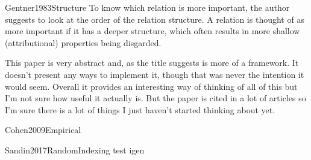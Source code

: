 \documentclass[10pt]{article}
\begin{document}
\begin{review}{Gentner1983Structure}
    To know which relation is more important, the author suggests to look at the order of the relation structure.
    A relation is thought of as more important if it has a deeper structure, which often results in more shallow (attributional) properties being disgarded.
    
    This paper is very abstract and, as the title suggests is more of a framework.
    It doesn't present any ways to implement it, though that was never the intention it would seem.
    Overall it provides an interesting way of thinking of all of this but I'm not sure how useful it actually is.
    But the paper is cited in a lot of articles so I'm sure there is a lot of things I just haven't started thinking about yet.
\end{review}

\begin{review}{Cohen2009Empirical}{}{}

\end{review}

\begin{review}{Sandin2017RandomIndexing}
    test igen
\end{review}

\listofreview

\newpage
\printbibliography
\end{document}
